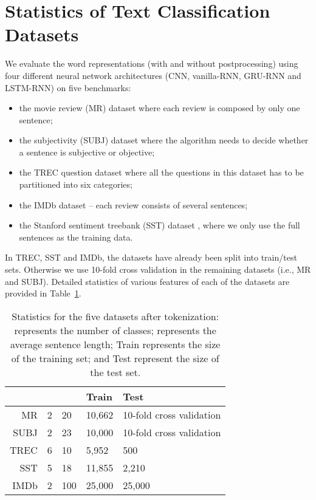 \documentclass{article} \usepackage{acl2017,times}
\begin{document}
\section{Statistics of Text Classification Datasets}
\label{app:sentiment}
We evaluate the word representations (with and without postprocessing) using  four different neural network architectures (CNN, vanilla-RNN, GRU-RNN and LSTM-RNN) on  five benchmarks: 
\begin{itemize}
\item the movie review (MR) dataset \citep{pang2005seeing} where each review is composed by only one sentence; 
\item the subjectivity (SUBJ) dataset \citep{pang2004sentimental}  where the algorithm needs to decide whether a sentence is subjective or objective; 
\item  the TREC question dataset \citep{li2002learning} where all the questions in this dataset has to be partitioned into six categories; 
\item  the IMDb dataset \citep{maas2011learning} -- each review consists of several sentences; 
\item the Stanford sentiment treebank (SST) dataset \citep{socher2013reasoning}, where we only use the full sentences as the training data. 
\end{itemize}

In TREC, SST and IMDb, the datasets have already been split into train/test sets. Otherwise we use 10-fold cross validation in the remaining datasets (i.e., MR and SUBJ). Detailed statistics of various features of each of the datasets are provided in Table~\ref{tb:sentiment-analysis-dataset}.

\begin{table}[!h]
\centering
\begin{tabular}{|r|l|l|l|l|}
\hline
     &  &   & Train    & Test   \\ \hline
MR   & 2   & 20   & 10,662 & 10-fold cross validation     \\ \hline
SUBJ & 2   & 23   & 10,000 & 10-fold cross validation     \\ \hline
TREC & 6   & 10   & 5,952  & 500    \\ \hline
SST  & 5   & 18   & 11,855 & 2,210  \\ \hline
IMDb & 2   & 100 & 25,000 & 25,000 \\ \hline
\end{tabular}
\caption{Statistics for the five datasets after tokenization:  represents the number of classes;  represents the average sentence length; Train represents the size of the training set; and Test represent the size of the test set.}
\label{tb:sentiment-analysis-dataset}
\end{table}
\end{document}
